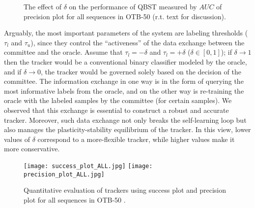 \documentclass[10pt, conference, compsocconf]{IEEEtran}
\begin{document}
\begin{figure}[!b]   
\centering
{}
\caption{The effect of $\delta$ on the performance of QBST measured by $AUC$ of precision plot for all sequences in OTB-50 \cite{wu2013online}(r.t. text for discussion).}
\label{fig:delta}
\vspace{-0.5 cm}
\end{figure}

Arguably, the most important parameters of the system are labeling thresholds ($\tau_l$ and $\tau_u$), since they control the ``activeness'' of the data exchange between the committee and the oracle. Assume that $\tau_l = -\delta$ and $\tau_l = +\delta$ ($\delta \in [0,1]$); if $\delta \rightarrow 1$ then the tracker would be a conventional binary classifier modeled by the oracle, and if $\delta \rightarrow 0$, the tracker would be governed solely based on the decision of the committee. The information exchange in one way is in the form of querying the most informative labels from the oracle, and on the other way is re-training the oracle with the labeled samples by the committee (for certain samples). We observed that this exchange is essential to construct a robust and accurate tracker. Moreover, such data exchange not only breaks the self-learning loop but also manages the plasticity-stability equilibrium of the tracker. In this view, lower values of $\delta$ correspond to a more-flexible tracker, while higher values make it more conservative.
\begin{figure}[!t]   
\centering
\texttt{[image: success\_plot\_ALL.jpg]}
\texttt{[image: precision\_plot\_ALL.jpg]}
\caption{Quantitative evaluation of trackers using success plot and precision plot for all sequences in OTB-50 \cite{wu2013online}.}
\label{fig:precision}
\vspace{-0.5 cm}
\end{figure}
\end{document}
